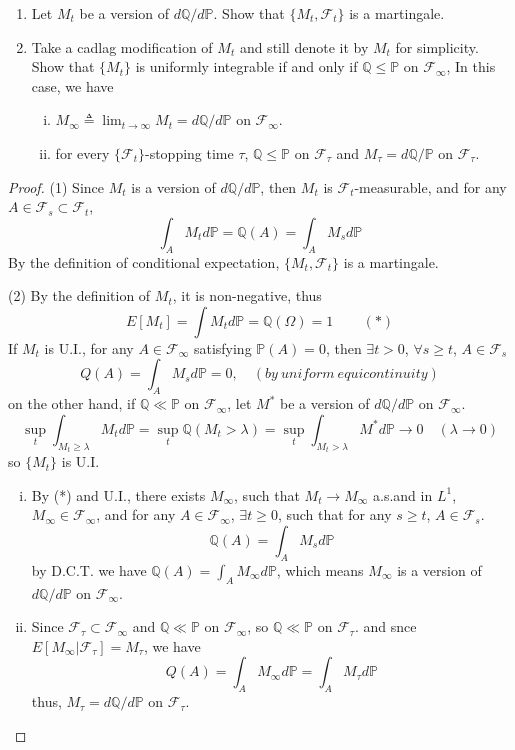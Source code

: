 \documentclass{article}     %
\begin{document}
\begin{enumerate}[(1)]
    \item Let $M_t$ be a version of $d \mathbb{Q}/d \mathbb{P}$. Show that $\{M_t,\mathcal{F}_t\}$ is a martingale.
    \item Take a cadlag modification of $M_t$ and still denote it by $M_t$ for simplicity. Show that $\{M_t\}$ is uniformly integrable if and only if $\mathbb{Q}\leq \mathbb{P}$ on $\mathcal{F}_{\infty}$, In this case, we have
    \begin{enumerate}[(i)]
        \item $M_{\infty}\triangleq \lim_{t\rightarrow \infty} M_t= d \mathbb{Q}/d \mathbb{P}$ on $\mathcal{F}_{\infty}$.
        \item for every $\{\mathcal{F}_t\}$-stopping time $\tau$, $\mathbb{Q}\leq \mathbb{P}$ on $\mathcal{F}_{\tau}$ and $M_{\tau}=d\mathbb{Q}/\mathbb{P}$ on $\mathcal{F}_{\tau}$.
        \end{enumerate}
    \end{enumerate}
\begin{proof}
(1) Since $M_t$ is a version of $d \mathbb{Q}/d \mathbb{P}$, then $M_t$ is $\mathcal{F}_t$-measurable, and for any $A\in \mathcal{F}_s\subset\mathcal{F}_t$,
\[\int_{A}M_td\mathbb{P}=\mathbb{Q}(A)=\int_{A}M_sd\mathbb{P}\]
By the definition of conditional expectation, $\{M_t,\mathcal{F}_t\}$ is a martingale.

(2) By the definition of $M_t$, it is non-negative, thus
\[E[M_t]=\int M_t d\mathbb{P}=\mathbb{Q}(\Omega)=1~~~~~\quad (*)\]
If $M_t$ is U.I., for any $A\in \mathcal{F}_{\infty}$ satisfying $\mathbb{P}(A)=0$, then $\exists t>0$, $\forall s\geq t$, $A\in \mathcal{F}_s$
\[Q(A)=\int_A M_sd\mathbb{P}=0, \quad  (by ~uniform~equicontinuity) \]
on the other hand, if $\mathbb{Q}\ll \mathbb{P}$ on $\mathcal{F}_{\infty}$, let $M^*$ be a version of $d \mathbb{Q}/d \mathbb{P}$ on $\mathcal{F}_{\infty}$.
\[\sup_t \int_{M_t\geq \lambda}M_td\mathbb{P}=\sup_t \mathbb{Q}(M_t>\lambda)=\sup_t\int_{M_t>\lambda}M^*d\mathbb{P}\rightarrow 0\quad (\lambda\rightarrow 0)\]
so $\{M_t\}$ is U.I.
\begin{enumerate}[(i)]
    \item By (*) and U.I., there exists $M_\infty$, such that $M_t \rightarrow M_{\infty}$ a.s.and in $L^1$,   $M_{\infty}\in \mathcal{F}_{\infty}$, and for any $A\in \mathcal{F}_{\infty}$, $\exists t\geq 0$, such that for any $s\geq t$, $A\in \mathcal{F}_s$.
    \[\mathbb{Q}(A)=\int_A M_sd\mathbb{P}\]
    by D.C.T. we have $\mathbb{Q}(A)=\int_A M_{\infty}d\mathbb{P}$, which means $M_{\infty}$ is a version of $d \mathbb{Q}/d \mathbb{P}$ on $\mathcal{F}_{\infty}$.
    \item  Since $\mathcal{F}_{\tau}\subset \mathcal{F}_{\infty}$ and $\mathbb{Q}\ll \mathbb{P}$ on $\mathcal{F}_{\infty}$, so $\mathbb{Q}\ll \mathbb{P}$ on $\mathcal{F}_{\tau}$. and snce $E[M_{\infty}|\mathcal{F}_{\tau}]=M_{\tau}$, we have 
    \[Q(A)=\int_{A}M_{\infty}d\mathbb{P}=\int_{A}M_{\tau}d\mathbb{P}\]
    thus, $M_{\tau}=d \mathbb{Q}/d\mathbb{P}$ on $\mathcal{F}_{\tau}$. 

\end{enumerate}


\end{proof}
\end{document}
